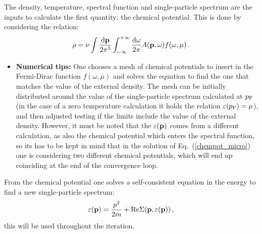  The density, temperature, spectral function and single-particle spectrum are the inputs to calculate the first quantity: the chemical potential. This is done by considering the relation:
\begin{equation}
\rho=\nu\int\frac{{\rm d}{\bf p}}{2\pi^3}\int_{-\infty}^{+\infty}\frac{{\rm d}{\omega}}{2\pi}A({\bf p},\omega)f(\omega,\mu)\,.
\label{chempot_micro}
\end{equation}
\begin{itemize}
\item {\bf Numerical tips:} One chooses a mesh of chemical potentials to insert in the Fermi-Dirac function $f(\omega,\mu)$ and solves the equation to find the one that matches the value of the external density. The mesh can be initially distributed around the value of the single-particle spectrum calculated at $p_{\rm F}$ (in the case of a zero temperature calculation it holds the relation $\varepsilon(p_{\rm F})=\mu$), and then adjusted testing if the limits include the value of the external density. However, it must be noted that the $\varepsilon({\bf p})$ comes from a different calculation, as also the chemical potential which enters the spectral function, so its has to be kept in mind that in the solution of Eq.~(\ref{chempot_micro}) one is considering two different chemical potentials, which will end up coinciding at the end of the convergence loop.
\end{itemize}

 From the chemical potential one solves a self-consistent equation in the energy to find a new single-particle spectrum:
\begin{equation}
\varepsilon({\bf p})=\frac{p^2}{2m}+{\rm Re}\Sigma({\bf p},\varepsilon({\bf p}))\,,
\end{equation}
this will be used throughout the iteration. 
 
